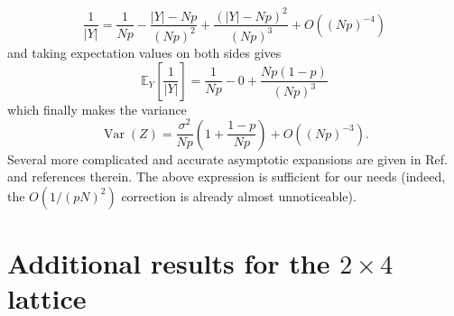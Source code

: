 \documentclass[aps,prb,twoside,superscriptaddress,longbibliography,nofootinbib,floatfix, notitlepage,twocolumn]{revtex4-1}
\begin{document}
{\begin{equation}
    \frac{1}{|Y|} = \frac{1}{Np} - \frac{|Y| - Np}{(Np)^2} + \frac{(|Y| - Np)^2}{(Np)^3}
    + O\left((Np)^{-4}\right)
\end{equation}
and taking expectation values on both sides gives
\begin{equation}
    \mathds{E}_Y \left[\frac{1}{|Y|}\right] = \frac{1}{Np} - 0 + \frac{N p (1-p)}{(Np)^3}
\end{equation}
which finally makes the variance
\begin{equation}
    \operatorname{Var}(Z) = \frac{\sigma^2}{Np} \left(1 + \frac{1-p}{Np} \right) 
    + O\left((Np)^{-3}\right).
\end{equation}
%
Several more complicated and accurate asymptotic expansions are given in Ref.~\cite{marciniak99} and references therein. The above expression is sufficient for our needs (indeed, the $O(1/(pN)^2)$ correction is already almost unnoticeable).


\section{Additional results for the $2\times 4$ lattice}
\label{app:2x4_figures}


}
\end{document}
